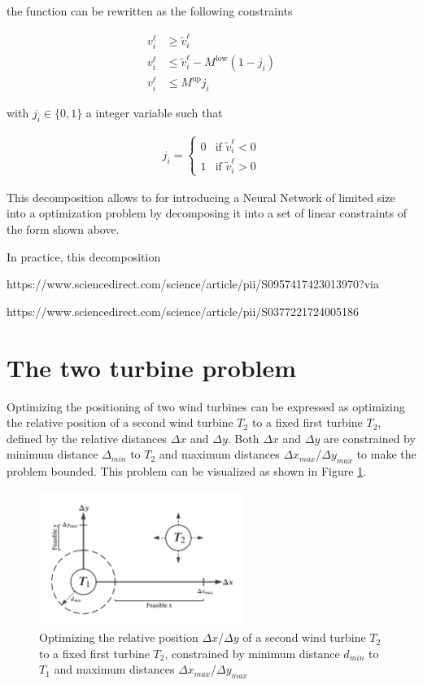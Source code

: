 the function can be rewritten as the following constraints 

\begin{align}
	v_i^\ell &\geq \tilde{v}_i^\ell \\
	v_i^\ell &\leq \tilde{v}_i^\ell - M^{\text{low}}(1 - j_i) \\
	v_i^\ell &\leq M^{\text{up}} j_i
\end{align}

with $j_i \in \{0,1\}$ a integer variable such that

\begin{align}
	j_i =
	\begin{cases}
		0 & \text{if } \tilde{v}_i^\ell < 0 \\
		1 & \text{if } \tilde{v}_i^\ell > 0
	\end{cases}
\end{align}

This decomposition allows to for introducing a Neural Network of limited size into a optimization problem by decomposing it into a set of linear constraints of the form shown above. \cite{ALCANTARA2023120895}

In practice, this decomposition 


https://www.sciencedirect.com/science/article/pii/S0957417423013970?via%

https://www.sciencedirect.com/science/article/pii/S0377221724005186


\section{The two turbine problem}

Optimizing the positioning of two wind turbines can be expressed as optimizing the relative position of a second wind turbine $T_2$ to a fixed first turbine $T_2$, defined by the relative distances $\Delta x$ and  $\Delta y$. Both  $\Delta x$ and  $\Delta y$ are constrained by minimum distance $\Delta_{min}$ to  $T_2$ and maximum distances $\Delta x_{max}$/$\Delta y_{max}$ to make the problem bounded. 
This problem can be visualized as shown in Figure \ref{fig:two_turbine_problem}.

\begin{figure}[h] 
	\centering
	\includegraphics[width=0.6\textwidth]{figures/optimization/two_turbine_problem_schematic.png} %
	\caption{Optimizing the relative position $\Delta x$/$\Delta y$ of a second wind turbine $T_2$ to a fixed first turbine $T_2$, constrained by minimum distance $d_{min}$ to  $T_1$ and maximum distances $\Delta x_{max}$/$\Delta y_{max}$}
	\label{fig:two_turbine_problem}
\end{figure}

